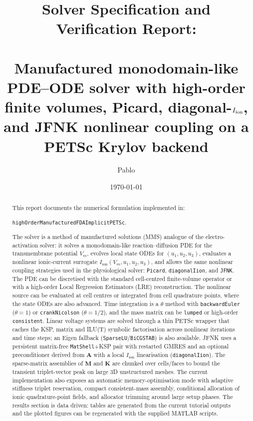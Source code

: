 \documentclass[11pt,a4paper]{article}
\title{Solver Specification and Verification Report:\\
       \texorpdfstring{\code{highOrderManufacturedFDAImplicitPETSc}}{highOrderManufacturedFDAImplicitPETSc}\\
       \large Manufactured monodomain-like PDE--ODE solver with high-order finite volumes,
       Picard, diagonal-\texorpdfstring{$\Iion$}{Iion}, and JFNK nonlinear coupling on a PETSc
       Krylov backend}
\author{Pablo}
\date{\today}
\newcommand{\code}[1]{\texttt{\small #1}}
\newcommand{\Vm}{V_m}
\newcommand{\Iion}{I_{\mathrm{ion}}}
\newcommand{\Mmass}{\mathbf{M}}
\newcommand{\Kstif}{\mathbf{K}}
\newcommand{\Aimp}{\mathbf{A}}
\begin{document}
\maketitle

\begin{abstract}
This report documents the numerical formulation implemented in:

\begin{center}
\code{highOrderManufacturedFDAImplicitPETSc}.
\end{center}

The solver is a method of
manufactured solutions (MMS) analogue of the electro-activation solver: it
solves a monodomain-like reaction--diffusion PDE for the transmembrane
potential $\Vm$, evolves local state ODEs for $(u_1,u_2,u_3)$, evaluates a
nonlinear ionic-current surrogate $\Iion(\Vm,u_1,u_2,u_3)$, and allows the same
nonlinear coupling strategies used in the physiological solver:
\code{Picard}, \code{diagonalIion}, and \code{JFNK}. The PDE can be discretised
with the standard cell-centred finite-volume operator or with a high-order
Local Regression Estimators (LRE) reconstruction. The nonlinear source can be
evaluated at cell centres or integrated from cell quadrature points, where the
state ODEs are also advanced. Time integration is a $\theta$ method with
\code{backwardEuler} ($\theta=1$) or \code{crankNicolson} ($\theta=1/2$), and
the mass matrix can be \code{lumped} or high-order \code{consistent}. Linear
voltage systems are solved through a thin PETSc wrapper that caches the KSP,
matrix and ILU(T) symbolic factorisation across nonlinear iterations and time
steps; an Eigen fallback (\code{SparseLU}/\code{BiCGSTAB}) is also available.
JFNK uses a persistent matrix-free \code{MatShell}+KSP pair with restarted
GMRES and an optional preconditioner derived from $\Aimp$ with a local
$\Iion$ linearisation (\code{diagonalIion}). The sparse-matrix assemblies of
$\Mmass$ and $\Kstif$ are chunked over cells/faces to bound the transient
triplet-vector peak on large 3D unstructured meshes. The current implementation
also exposes an automatic memory-optimisation mode with adaptive stiffness
triplet reservation, compact consistent-mass assembly, conditional allocation
of ionic quadrature-point fields, and allocator trimming around large setup
phases. The results section is
data driven: tables are generated from the current tutorial outputs and the
plotted figures can be regenerated with the supplied MATLAB scripts.
\end{abstract}
\end{document}
